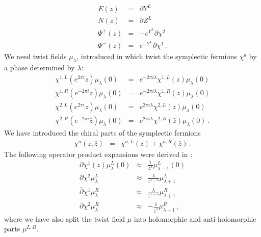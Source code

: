 \documentclass[12pt]{article}
\numberwithin{equation}{section}
\numberwithin{equation}{section}
\numberwithin{table}{section}\setlength{\multlinegap}{25pt}
\begin{document}
\begin{eqnarray}
E(z) &=&  \partial Y^L \nonumber \\
N(z) &=& \partial Z^L \nonumber \\
\Psi^+(z) &=&   -e^{Y^L} \partial \chi^2 \nonumber \\
\Psi^-(z) &=&  e^{-Y^L} \partial \chi^1 \, . \label{leftcurrents}
\end{eqnarray}
We need twist fields $\mu_\lambda$, introduced in \cite{Kausch:2000fu}
which twist the symplectic fermions $\chi^a$ by a phase determined by $\lambda$:
\begin{eqnarray}
\chi^{1,L}(e^{2 \pi i} z) \mu_{\lambda}(0) &=& e^{- 2 \pi i \lambda} \chi^{1,L}(z) \mu_\lambda(0) \nonumber \\
\chi^{1,R}(e^{-2 \pi i} \bar{z}) \mu_{\lambda}(0) &=& e^{- 2 \pi i \lambda} \chi^{1,R}(\bar{z}) \mu_\lambda(0) \nonumber \\
\chi^{2,L}(e^{2 \pi i} z) \mu_{\lambda}(0) &=& e^{ 2 \pi i \lambda} \chi^{2,L}(z) \mu_\lambda(0) \nonumber \\
\chi^{2,R}(e^{-2 \pi i} \bar{z}) \mu_{\lambda}(0) &=& e^{ 2 \pi i \lambda} \chi^{2,R}(\bar{z}) \mu_\lambda(0) \, .
\end{eqnarray}
We have introduced the chiral parts of the symplectic fermions
\begin{eqnarray}
\chi^a(z,\bar{z}) &=& \chi^{a,L} (z) + \chi^{a,R} (\bar{z}) \, .
\end{eqnarray}
The following operator product expansions were derived in  \cite{LeClair:2007aj,Creutzig:2008an}:
\begin{eqnarray}
\partial \chi^1(z) \mu_\lambda^L(0) & \approx & \frac{1}{z^\lambda} \mu^L_{\lambda-1}(0)
\nonumber \\
\partial \chi^2  \mu_\lambda^L & \approx & \frac{\lambda}{z^{1-\lambda}} \mu^L_{\lambda+1}
\nonumber \\
\bar{\partial} \chi^1 \mu_\lambda^R & \approx & \frac{\lambda}{\bar{z}^{1-\lambda}} \mu^R_{\lambda+1}
\nonumber \\
\bar{\partial} \chi^2  \mu_\lambda^R & \approx & -\frac{1}{\bar{z}^\lambda} \mu^R_{\lambda-1} \, ,
\end{eqnarray}
where we have also split the twist field $\mu$ into holomorphic and anti-holomorphic parts $\mu^{L,R}$.
\end{document}

